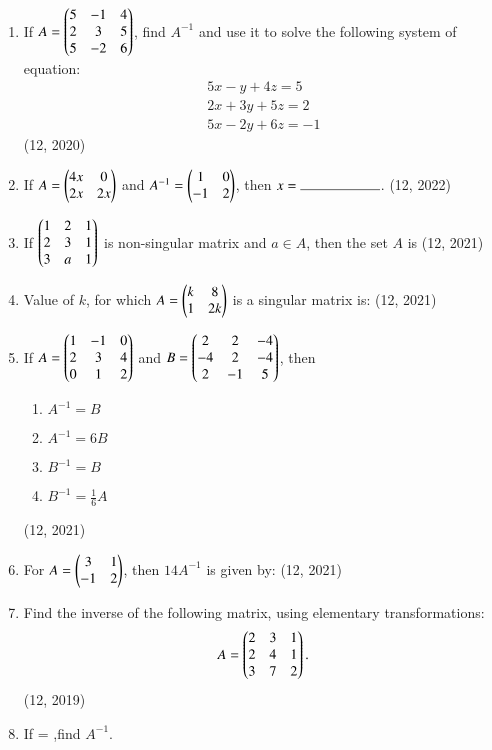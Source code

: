 \begin{enumerate}[label=\thesubsection.\arabic*,ref=\thesubsection.\theenumi]
\item If $A= \begin{pmatrix}5&-1&4\\ 2&3&5\\ 5&-2&6\end{pmatrix}$, find $A^{-1}$ and use it to solve the following system of equation: 
		\begin{align}
			5x-y+4z=5\\
			2x+3y+5z=2\\
			5x-2y+6z=-1
		\end{align}
\hfill (12, 2020)
\item If $A= \begin{pmatrix}4x&0\\2x&2x\end{pmatrix}$ and $A^{-1}=\begin{pmatrix}1&0\\-1&2\end{pmatrix}$, then $x= \rule{2cm}{0.15mm}$.
\hfill (12, 2022)
\item If $\begin{pmatrix}1 & 2 & 1 \\2 & 3 & 1 \\3 & a & 1\end{pmatrix}$
is non-singular matrix and  $a \in A $, then the set $A$ is 
\hfill (12, 2021)
   \item Value of $k$, for which $A =\begin{pmatrix}k & 8 \\ 1 & 2k\end{pmatrix}$ is a singular matrix is:
\hfill (12, 2021)
    \item If $A =\begin{pmatrix}1 &-1 & 0 \\2&3 & 4 \\0&1&2\end{pmatrix}$ and $B = \begin{pmatrix}2&2&-4\\-4&2&-4\\2&-1&5\end{pmatrix}$, then
    \begin{enumerate}
        \item $A^{-1} = B$
        \item $A^{-1} = 6B$
        \item $B^{-1} = B$
        \item $B^{-1} = \frac{1}{6} A$
    \end{enumerate}
\hfill (12, 2021)
    \item For $A =
        \begin{pmatrix}3 & 1 \\ -1 & 2\end{pmatrix}$, then $14A^{-1}$ is given by:
\hfill (12, 2021)
\item Find the inverse of the following matrix, using elementary
transformations: 
\begin{align*}
    A=\begin{pmatrix}2 & 3 & 1\\2 & 4 & 1\\3 & 7 & 2\end{pmatrix}.
\end{align*}
\hfill (12, 2019)
\item If  = ,find $A^{-1}$.

\end{enumerate}
